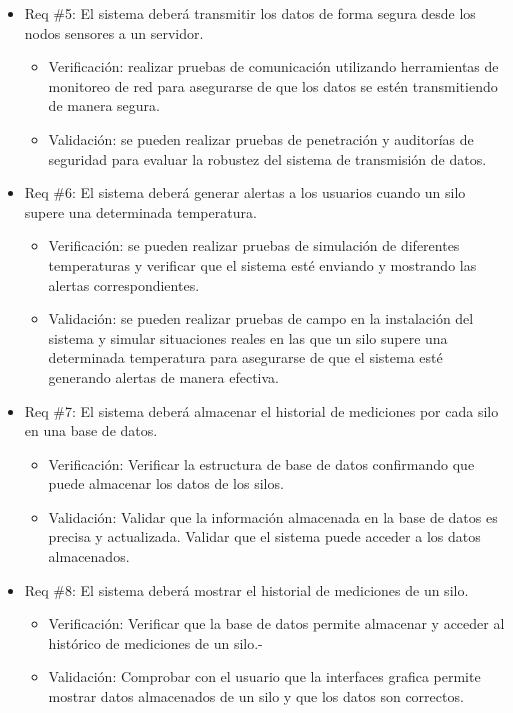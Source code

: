\documentclass[
11pt, %
]{charter}
\begin{document}
\begin{itemize}
\item Req \#5: El sistema deberá transmitir los datos de forma segura desde los nodos sensores a un
servidor.
\begin{itemize}
	\item Verificación: realizar pruebas de comunicación utilizando herramientas de monitoreo de red para asegurarse de que los datos se estén transmitiendo de manera segura.
	\item Validación: se pueden realizar pruebas de penetración y auditorías de seguridad para evaluar la robustez del sistema de transmisión de datos.
\end{itemize}

\item Req \#6: El sistema deberá generar alertas a los usuarios cuando un silo supere una determinada temperatura.
\begin{itemize}
	\item Verificación: se pueden realizar pruebas de simulación de diferentes temperaturas y verificar que el sistema esté enviando y mostrando las alertas correspondientes. 
	\item Validación: se pueden realizar pruebas de campo en la instalación del sistema y simular situaciones reales en las que un silo supere una determinada temperatura para asegurarse de que el sistema esté generando alertas de manera efectiva.
\end{itemize}

\item Req \#7: El sistema deberá almacenar el historial de mediciones por cada silo en una base de
datos.
\begin{itemize}
	\item Verificación: Verificar la estructura de base de datos confirmando que puede almacenar los datos de los silos.
	\item Validación: Validar que la información almacenada en la base de datos es precisa y actualizada. Validar que el sistema puede acceder a los datos almacenados. 
\end{itemize}

\item Req \#8: El sistema deberá mostrar el historial de mediciones de un silo.
\begin{itemize}
	\item Verificación: Verificar que la base de datos permite almacenar y acceder al histórico de mediciones de un silo.- 
	\item Validación: Comprobar con el usuario que la interfaces grafica permite mostrar datos almacenados de un silo y que los datos son correctos. 
\end{itemize}


\end{itemize}
\end{document}
